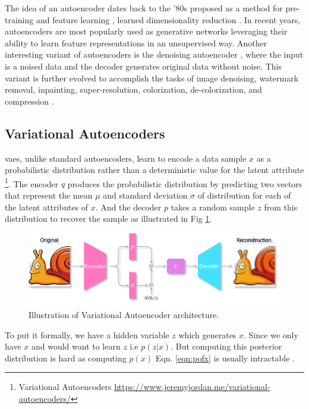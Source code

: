The idea of an autoencoder dates back to the '80s proposed as a method for pre-training and feature learning \cite{ballard1987modular, rumelhart1985learning}, learned dimensionality reduction \cite{hinton_dimentionality}. In recent years, autoencoders are most popularly used as generative networks leveraging their ability to learn feature representations in an unsupervised way. Another interesting variant of autoencoders is the denoising autoencoder \cite{vincent2008extracting}, where the input is a noised data and the decoder generates original data without noise. This variant is further evolved to accomplish the tasks of image denoising, watermark removal, inpainting, super-resolution, colorization, de-colorization, and compression \cite{zhang2016colorful, imagedenoisingpaper,deepimageprior}. 

\subsection{Variational Autoencoders}
\label{subsec:vae}
\acp{vae}, unlike standard autoencoders, learn to encode a data sample $x$ as a probabilistic distribution rather than a deterministic value for the latent attribute \footnote{\label{note:jeremy_jordan} Variational Autoencoders \url{https://www.jeremyjordan.me/variational-autoencoders/}}. The encoder $q$ produces the probabilistic distribution by predicting two vectors that represent the mean $\mu$ and standard deviation $\sigma$ of distribution for each of the latent attributes of $x$. And the decoder $p$ takes a random sample $z$ from this distribution to recover the sample as illustrated in Fig \ref{fig:vae_arch}.

\begin{figure}[h]
    \centering
    \includegraphics[width=\textwidth]{figures/arch/vae_arch.png}
    \caption{Illustration of Variational Autoencoder architecture.}
    \label{fig:vae_arch}
\end{figure}

To put it formally, we have a hidden variable $z$ which generates $x$. Since we only have $x$ and would want to learn $z$ i.e $p(z | x)$. But computing this posterior distribution is hard as computing $p(x)$ Eqn. \ref{eqn:pofx} is usually intractable \cite{kingma2013autoencoding}.

